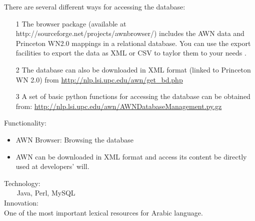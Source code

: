 There are several different ways for accessing the database:\\
\begin{itemize}
\item[1] The browser package (available at http://sourceforge.net/projects/awnbrowser/) includes the AWN data and Princeton WN2.0 mappings in a relational database. You can use the export facilities to export the data as XML or CSV to taylor them to your needs .\\
\item[2] The database can also be downloaded in XML format (linked to Princeton WN 2.0) from \url {http://nlp.lsi.upc.edu/awn/get_bd.php}\\
\item[3] A set of basic python functions for accessing the database can be obtained from: \url {http://nlp.lsi.upc.edu/awn/AWNDatabaseManagement.py.gz}\\
\end{itemize}
Functionality:\\
\begin{itemize}
\item AWN Browser: Browsing the database\\
\item AWN can be downloaded in XML format and access its content be directly used at developers' will.\\
\end{itemize}
Technology:\\
    Java, Perl, MySQL\\
Innovation:\\
	One of the most important lexical resources for Arabic language.\\

